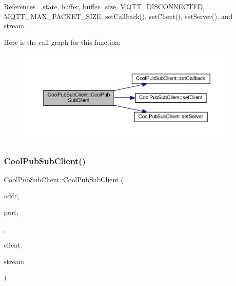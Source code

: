 References \+\_\+state, buffer, buffer\+\_\+size, M\+Q\+T\+T\+\_\+\+D\+I\+S\+C\+O\+N\+N\+E\+C\+T\+ED, M\+Q\+T\+T\+\_\+\+M\+A\+X\+\_\+\+P\+A\+C\+K\+E\+T\+\_\+\+S\+I\+ZE, set\+Callback(), set\+Client(), set\+Server(), and stream.

Here is the call graph for this function\+:\nopagebreak
\begin{figure}[H]
\begin{center}
\leavevmode
\includegraphics[width=350pt]{d8/d4b/class_cool_pub_sub_client_a1743a9eeef19b3b6ff1db5be8df55a9c_cgraph}
\end{center}
\end{figure}
\mbox{\label{class_cool_pub_sub_client_a0797679d710bf2b1aa802107bdb1a2fe}} 
\subsubsection{\texorpdfstring{Cool\+Pub\+Sub\+Client()}{CoolPubSubClient()}\hspace{0.1cm}{\footnotesize\ttfamily [6/14]}}
{\footnotesize\ttfamily Cool\+Pub\+Sub\+Client\+::\+Cool\+Pub\+Sub\+Client (\begin{DoxyParamCaption}\item[{I\+P\+Address}]{addr,  }\item[{uint16\+\_\+t}]{port,  }\item[{\hyperlink{class_cool_pub_sub_client_a021ec75e9fbaf658370b8005ccfddc14}{M\+Q\+T\+T\+\_\+\+C\+A\+L\+L\+B\+A\+C\+K\+\_\+\+S\+I\+G\+N\+A\+T\+U\+RE}}]{,  }\item[{Client \&}]{client,  }\item[{Stream \&}]{stream }\end{DoxyParamCaption})}



